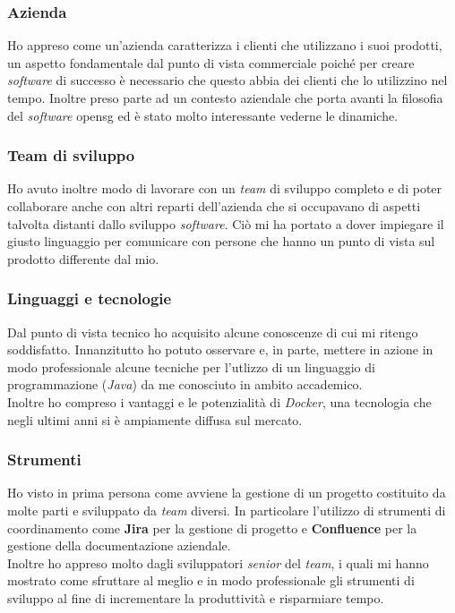 \subsubsection{Azienda}
Ho appreso come un'azienda caratterizza i clienti che utilizzano i suoi prodotti, un aspetto fondamentale dal punto di vista commerciale poiché per creare \textit{software} di successo è necessario che questo abbia dei clienti che lo utilizzino nel tempo. Inoltre preso parte ad un contesto aziendale che porta avanti la filosofia del \textit{software} \gls{opensg} ed è stato molto interessante vederne le dinamiche.

\subsubsection{Team di sviluppo}
Ho avuto inoltre modo di lavorare con un \textit{team} di sviluppo completo e di poter collaborare anche con altri reparti dell'azienda che si occupavano di aspetti talvolta distanti dallo sviluppo \textit{software}. Ciò mi ha portato a dover impiegare il giusto linguaggio per comunicare con persone che hanno un punto di vista sul prodotto differente dal mio.

\subsubsection{Linguaggi e tecnologie}
Dal punto di vista tecnico ho acquisito alcune conoscenze di cui mi ritengo soddisfatto. Innanzitutto ho potuto osservare e, in parte, mettere in azione in modo professionale alcune tecniche per l'utlizzo di un linguaggio di programmazione (\textit{Java}) da me conosciuto in ambito accademico. \\
Inoltre ho compreso i vantaggi e le potenzialità di \textit{Docker}, una tecnologia che negli ultimi anni si è ampiamente diffusa sul mercato.

\subsubsection{Strumenti}
Ho visto in prima persona come avviene la gestione di un progetto costituito da molte parti e sviluppato da \textit{team} diversi. In particolare l'utilizzo di strumenti di coordinamento come \textbf{Jira} per la gestione di progetto e \textbf{Confluence} per la gestione della documentazione aziendale. \\
Inoltre ho appreso molto dagli sviluppatori \textit{senior} del \textit{team}, i quali mi hanno mostrato come sfruttare al meglio e in modo professionale gli strumenti di sviluppo al fine di incrementare la produttività e risparmiare tempo.


